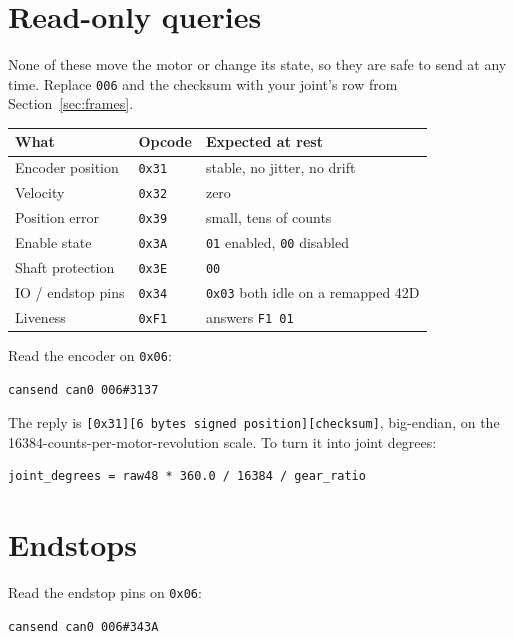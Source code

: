 \documentclass[11pt,letterpaper]{article}
\begin{document}
\section{Read-only queries}

None of these move the motor or change its state, so they are safe to send at any
time. Replace \texttt{006} and the checksum with your joint's row from
Section~\ref{sec:frames}.

\begin{center}
\begin{tabular}{lll}
\toprule
\textbf{What} & \textbf{Opcode} & \textbf{Expected at rest} \\ \midrule
Encoder position   & \texttt{0x31} & stable, no jitter, no drift \\
Velocity           & \texttt{0x32} & zero \\
Position error     & \texttt{0x39} & small, tens of counts \\
Enable state       & \texttt{0x3A} & \texttt{01} enabled, \texttt{00} disabled \\
Shaft protection   & \texttt{0x3E} & \texttt{00} \\
IO / endstop pins  & \texttt{0x34} & \texttt{0x03} both idle on a remapped 42D \\
Liveness           & \texttt{0xF1} & answers \texttt{F1 01} \\
\bottomrule
\end{tabular}
\end{center}

Read the encoder on \texttt{0x06}:

\begin{lstlisting}
cansend can0 006#3137
\end{lstlisting}

The reply is \texttt{[0x31][6 bytes signed position][checksum]}, big-endian, on the
16384-counts-per-motor-revolution scale. To turn it into joint degrees:

\begin{lstlisting}
joint_degrees = raw48 * 360.0 / 16384 / gear_ratio
\end{lstlisting}

\section{Endstops}

Read the endstop pins on \texttt{0x06}:

\begin{lstlisting}
cansend can0 006#343A
\end{lstlisting}
\end{document}
